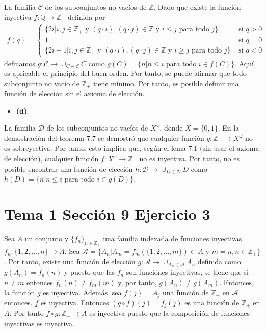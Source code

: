 \documentclass{article}
\begin{document}
La familia $\mathcal{C}$ de los subconjuntos no vacíos de $\mathbb{Z}$. Dado que existe la función inyectiva $f:\mathbb{Q}\rightarrow \mathbb{Z}_{+}$ definida por
\begin{eqnarray}
f(q)=\begin{cases}
\{2i|i,j\in \mathbb{Z}_{+}\text{ y } (q\cdot i),(q\cdot j)\in \mathbb{Z}\text{ y } i\leq j \text{ para todo }j\}& \text{ si }q> 0\nonumber\\
1& \text{ si } q=0\nonumber\\
\{2i+1|i,j\in \mathbb{Z}_{+}\text{ y } (q\cdot i),(q\cdot j)\in \mathbb{Z}\text{ y } i\geq j \text{ para todo }j\} & \text{ si } q< 0 \nonumber
\end{cases}
\end{eqnarray}
definamos $g:\mathcal{C}\rightarrow \cup_{C\in\mathcal{C}}C$ como
$g(C)=\{n| n\leq i \text{ para todo } i\in f(C) \}$. Aquí es apricable el principio del buen orden. Por tanto, se puede afirmar que todo subconjunto no vacío de $\mathbb{Z}_{+}$ tiene mínimo. Por tanto, es posible definir una función de elección sin el axioma de elección.
\begin{itemize}
\item \bf (d) \rm
\end{itemize}
La familia $\mathcal{D}$ de los subconjuntos no vacíos de $X^{\omega}$, donde $X=\{0,1\}$.  En la demostración del teorema 7.7 se demostró que cualquier función $g:\mathbb{Z}_{+}\rightarrow X^{\omega}$ no es sobreyectiva. Por tanto, esto implica que, según el lema 7.1 (sin usar el axioma de elección), cualquier función $f:X^{\omega}\rightarrow \mathbb{Z}_{+}$ no es inyectiva. Por tanto, no es posible encontrar una función de elección $h:\mathcal{D}\rightarrow \cup_{D\in\mathcal{D}}D$ como
$h(D)=\{n| n\leq i \text{ para todo } i\in g(D) \}$.
\section{Tema 1 Sección 9 Ejercicio 3}
Sea $A$ un conjunto y $\{f_n\}_{n\in\mathbb{Z}_{+}}$ una familia indexada de funciones inyectivas $f_n:\{1,2,...,n\}\longrightarrow A$. Sea $ \mathcal{A}=\{A_n|A_m=f_m(\{1,2,...,m\})\subset A \text{ y }m=n,n\in \mathbb{Z}_{+}\}$. Por tanto, existe una función de elección $g:\mathcal{A}\longrightarrow \cup_{A_n\in \mathcal{A}}A_n$
definida como $g(A_n)=f_n(n)$ y puesto que las $f_n$ son funciónes inyectivas, se tiene que si $n\neq m$ entonces $f_n(n)\neq f_m(m)$ y, por tanto,  $g(A_n) \neq  g(A_m)$. Entonces, la función $g$ es inyectiva. Además, sea $f(j)=A_j$ una función de $\mathbb{Z}_{+}$ en $\mathcal{A}$ entonces, $f$ es inyectiva. Entonces $(g\circ f)(j)=f_j(j)$ es una función de $\mathbb{Z}_{+}$ en $A$. Por tanto $f\circ g:\mathbb{Z}_{+}\longrightarrow A$ es inyectiva puesto que la composición de funciones inyectivas es inyectiva.
\end{document}
